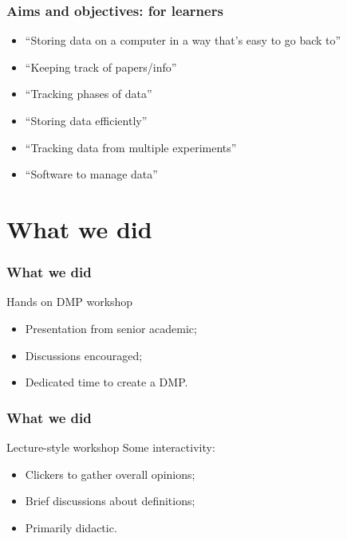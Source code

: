 \begin{frame}
  \frametitle{Aims and objectives: for learners}
  
  \begin{itemize}[<+>]
    \item ``Storing data on a computer in a way that's easy to go back to''
    \item ``Keeping track of papers/info''
    \item ``Tracking phases of data''
    \item ``Storing data efficiently''
    \item ``Tracking data from multiple experiments''
    \item ``Software to manage data''
  \end{itemize}

\end{frame}

  
  

\section{What we did}

\begin{frame}
  \frametitle{What we did}
  
  \begin{block}{Hands on DMP workshop}
    \begin{itemize}
      \item Presentation from senior academic;
      \item Discussions encouraged;
      \item Dedicated time to create a DMP.
    \end{itemize}
  \end{block}
\end{frame}

\begin{frame}
  \frametitle{What we did}
  
  \begin{block}{Lecture-style workshop}
    Some interactivity:
    \begin{itemize}
      \item Clickers to gather overall opinions;
      \item Brief discussions about definitions;
      \item Primarily didactic.
    \end{itemize}
  \end{block}
\end{frame}

